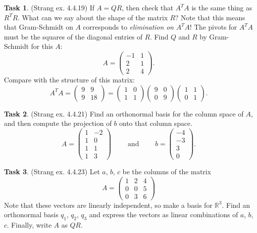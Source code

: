 \documentclass[10pt,]{book}
\theoremstyle{plain}
\theoremstyle{definition}
\numberwithin{equation}{section}
\newtheorem{task}{Task}[chapter]
\begin{document}
\begin{task}
\label{task-141}
(Strang ex. 4.4.19)
        If \(A = QR\), then check that \(A^TA\) is the same thing as \(R^TR\).
        What can we say about the shape of the matrix \(R\)? Note that this means
        that Gram-Schmidt on \(A\) corresponds to \emph{elimination on \(A^TA\)}!
        The pivots for \(A^TA\) must be the squares of the diagonal entries of
        \(R\). Find \(Q\) and \(R\) by Gram-Schmidt for this \(A\):
        \[
          A = \begin{pmatrix} -1 & 1 \\ 2 & 1 \\ 2 & 4 \end{pmatrix}.
        \]
        Compare with the structure of this matrix:
        \[
          A^TA = \begin{pmatrix} 9 & 9 \\ 9 & 18 \end{pmatrix}
          = \begin{pmatrix} 1 & 0 \\ 1 & 1 \end{pmatrix}
          \begin{pmatrix} 9 & 0 \\ 0 & 9 \end{pmatrix}
          \begin{pmatrix}  1 & 1 \\ 0 & 1 \end{pmatrix}.
        \]\end{task}
\begin{task}
\label{task-142}
(Strang ex. 4.4.21)
        Find an orthonormal basis for the column space of \(A\), and then compute
        the projection of \(b\) onto that column space.
        \[
          A = \begin{pmatrix} 1 & -2 \\ 1 & 0 \\ 1 & 1 \\ 1 & 3\end{pmatrix}
          \qquad \text{ and } \qquad b = \begin{pmatrix} -4 \\ -3 \\ 3 \\ 0 \end{pmatrix}.
        \]\end{task}
\begin{task}
\label{task-143}
(Strang ex. 4.4.23)
        Let \(a\), \(b\), \(c\) be the columns of the matrix
        \[
          A = \begin{pmatrix} 1 & 2 & 4 \\ 0 & 0 & 5 \\
          0 & 3 & 6 \end{pmatrix}
        \]
        Note that these vectors are linearly independent, so make a basis for
        \(\mathbb{R}^3\).
        Find an orthonormal basis \(q_1\), \(q_2\), \(q_3\) and express
        the vectors as linear combinations of \(a\), \(b\), \(c\).
        Finally, write \(A\) as \(QR\).
      \end{task}
\end{document}
